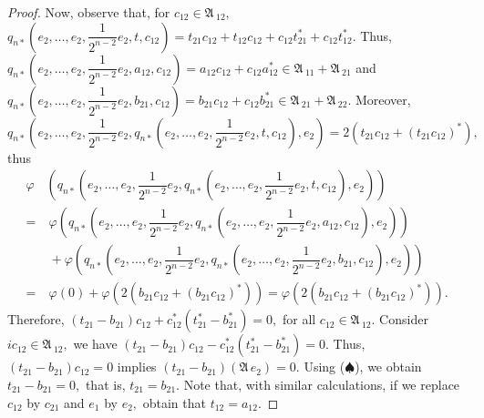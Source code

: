 \documentclass[10pt,a4paper]{amsart}
\newtheorem{comment}{Comment}
\def\A{{\mathfrak A}\, }
\begin{document}
\begin{proof}
Now, observe that, for $c_{12}\in \A_{12},$ $q_{n*}\left(e_2, \ldots, e_2,\dfrac{1}{2^{n-2}}e_2,t,c_{12}\right) = t_{21}c_{12}+t_{12}c_{12}+c_{12}t_{21}^*+c_{12}t_{12}^*.$ Thus, $q_{n*}\left(e_2,\ldots,e_2,\dfrac{1}{2^{n-2}}e_2,a_{12},c_{12}\right) = a_{12}c_{12}+c_{12}a_{12}^* \in \A_{11}+\A_{21}$ and $q_{n*}\left(e_2, \ldots,e_2, \dfrac{1}{2^{n-2}}e_2,b_{21},c_{12}\right)=b_{21}c_{12}+c_{12}b_{21}^* \in \A_{21}+\A_{22}.$ Moreover, 
\[q_{n*}\left(e_2, \ldots, e_2, \dfrac{1}{2^{n-2}}e_2, q_{n*}\left(e_2, \ldots, e_2,\dfrac{1}{2^{n-2}}e_2,t,c_{12}\right),e_2\right) =2(t_{21}c_{12}+(t_{21}c_{12})^*),
\]
thus 
\begin{align*}
\varphi& \left(q_{n*}\left(e_2,\ldots,e_2, \dfrac{1}{2^{n-2}}e_2,q_{n*}\left(e_2, \ldots,e_2, \dfrac{1}{2^{n-2}}e_2,t,c_{12}\right),e_2\right)\right) \\
=& \ \varphi\left(q_{n*}\left(e_2,\ldots,e_2,\dfrac{1}{2^{n-2}}e_2,q_{n*}\left(e_2, \ldots,e_2,\dfrac{1}{2^{n-2}}e_2,a_{12},c_{12}\right),e_2\right)\right)\\
& \ +\varphi\left(q_{n*}\left(e_2,\ldots,e_2,\dfrac{1}{2^{n-2}}e_2,q_{n*}\left(e_2, \ldots,e_2,\dfrac{1}{2^{n-2}}e_2,b_{21},c_{12}\right),e_2\right)\right) \\
=& \ \varphi(0) + \varphi(2(b_{21}c_{12}+(b_{21}c_{12})^*))=\varphi(2(b_{21}c_{12}+(b_{21}c_{12})^*)).
\end{align*}
Therefore, $(t_{21}-b_{21})c_{12}+c_{12}^*(t_{21}^*-b_{21}^*)=0,$ for all $c_{12}\in \A_{12}.$ Consider $ic_{12}\in \A_{12},$ we have $(t_{21}-b_{21})c_{12}-c_{12}^*(t_{21}^*-b_{21}^*)=0.$ Thus, $(t_{21}-b_{21})c_{12}=0$ implies $(t_{21}-b_{21})(\A e_2) = 0.$ Using ($\spadesuit$), we obtain $t_{21}-b_{21}=0,$ that is, $t_{21}=b_{21}.$ Note that, with similar calculations, if we replace $c_{12}$ by $c_{21}$ and $e_1$ by $e_2,$ obtain that $t_{12} = a_{12}.$

\end{proof}
\end{document}
